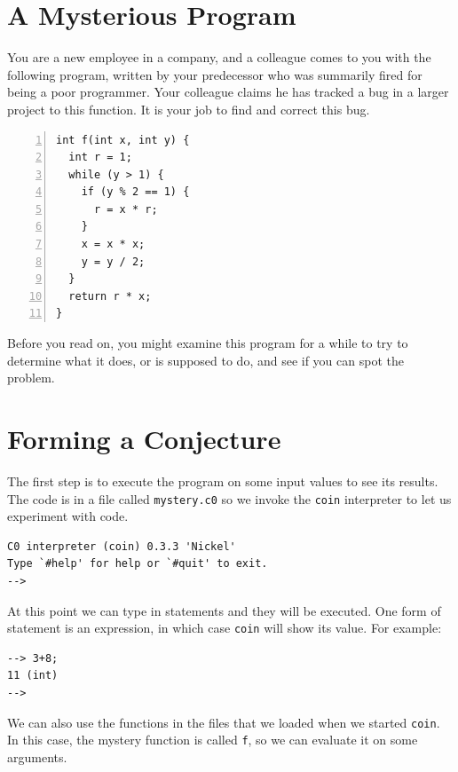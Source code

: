 \newpage
\section{A Mysterious Program}
\label{sec:contracts:mysterious}

You are a new employee in a company, and a colleague comes to you with
the following program, written by your predecessor who was summarily
fired for being a poor programmer.  Your colleague claims he has
tracked a bug in a larger project to this function.  It is your job
to find and correct this bug.

\begin{lstlisting}[language={[C0]C}, numbers=left]
int f(int x, int y) {
  int r = 1;
  while (y > 1) {
    if (y % 2 == 1) {
      r = x * r;
    }
    x = x * x;
    y = y / 2;
  }
  return r * x;
}
\end{lstlisting}

Before you read on, you might examine this program for a while to
try to determine what it does, or is supposed to do, and see if you
can spot the problem.

\clearpage
\section{Forming a Conjecture}
\label{sec:contracts:conjecture}

The first step is to execute the program on some input values to see
its results.  The code is in a file called \lstinline'mystery.c0'
so we invoke the \lstinline'coin' interpreter to let us experiment with
code.

\begin{lstlisting}[language={[coin]C}]
% coin mystery.c0
C0 interpreter (coin) 0.3.3 'Nickel'
Type `#help' for help or `#quit' to exit.
-->
\end{lstlisting}

At this point we can type in statements and they will be executed.
One form of statement is an expression, in which case \lstinline'coin'
will show its value.  For example:

\begin{lstlisting}[language={[coin]C}]
--> 3+8;
11 (int)
-->
\end{lstlisting}

We can also use the functions in the files that we loaded when we started
\lstinline'coin'.  In this case, the mystery function is called \lstinline'f', so
we can evaluate it on some arguments.

